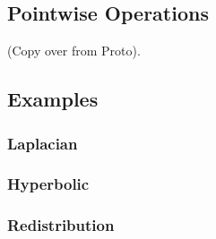\documentclass[12pt]{article}
\begin{document}
\subsection{Pointwise Operations}
(Copy over from Proto).

\subsection{Examples}
\subsubsection{Laplacian}
\subsubsection{Hyperbolic}
\subsubsection{Redistribution}
\end{document}
